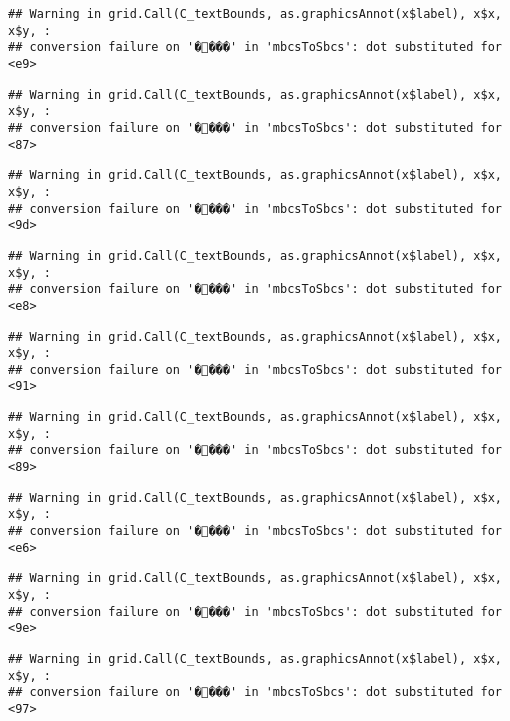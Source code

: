 \documentclass[
]{article}
\begin{document}
\begin{verbatim}
## Warning in grid.Call(C_textBounds, as.graphicsAnnot(x$label), x$x, x$y, :
## conversion failure on '����' in 'mbcsToSbcs': dot substituted for <e9>
\end{verbatim}

\begin{verbatim}
## Warning in grid.Call(C_textBounds, as.graphicsAnnot(x$label), x$x, x$y, :
## conversion failure on '����' in 'mbcsToSbcs': dot substituted for <87>
\end{verbatim}

\begin{verbatim}
## Warning in grid.Call(C_textBounds, as.graphicsAnnot(x$label), x$x, x$y, :
## conversion failure on '����' in 'mbcsToSbcs': dot substituted for <9d>
\end{verbatim}

\begin{verbatim}
## Warning in grid.Call(C_textBounds, as.graphicsAnnot(x$label), x$x, x$y, :
## conversion failure on '����' in 'mbcsToSbcs': dot substituted for <e8>
\end{verbatim}

\begin{verbatim}
## Warning in grid.Call(C_textBounds, as.graphicsAnnot(x$label), x$x, x$y, :
## conversion failure on '����' in 'mbcsToSbcs': dot substituted for <91>
\end{verbatim}

\begin{verbatim}
## Warning in grid.Call(C_textBounds, as.graphicsAnnot(x$label), x$x, x$y, :
## conversion failure on '����' in 'mbcsToSbcs': dot substituted for <89>
\end{verbatim}

\begin{verbatim}
## Warning in grid.Call(C_textBounds, as.graphicsAnnot(x$label), x$x, x$y, :
## conversion failure on '����' in 'mbcsToSbcs': dot substituted for <e6>
\end{verbatim}

\begin{verbatim}
## Warning in grid.Call(C_textBounds, as.graphicsAnnot(x$label), x$x, x$y, :
## conversion failure on '����' in 'mbcsToSbcs': dot substituted for <9e>
\end{verbatim}

\begin{verbatim}
## Warning in grid.Call(C_textBounds, as.graphicsAnnot(x$label), x$x, x$y, :
## conversion failure on '����' in 'mbcsToSbcs': dot substituted for <97>
\end{verbatim}
\end{document}
